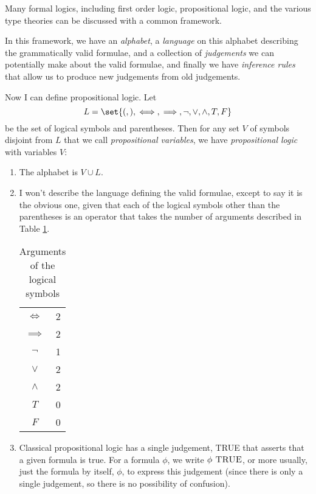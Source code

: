 \documentclass{article}
\theoremstyle{remark}
\newcommand\TRUE{\textsc{ TRUE}}
\begin{document}
Many formal logics, including first order logic,
propositional logic, and the various type theories
can be discussed
with a common framework. 

In this framework, we have an \emph{alphabet},
a \emph{language} on this alphabet describing the grammatically
valid formulae, and a collection of 
\emph{judgements} we can potentially make about the valid formulae,
and finally we have \emph{inference rules} that allow us to 
produce new judgements from old judgements.

\begin{definition}
    Now I can define propositional logic. 
    Let 
    \[ L=\set{(,),\iff,\implies,
    \lnot,\vee,\wedge,
    T,F} \]
    be the set of logical symbols and parentheses.
    Then for any set $V$ 
    of symbols disjoint from $L$ 
    that we call \emph{propositional variables},
    we have \emph{propositional logic} with variables $V$:
    \begin{enumerate}
        \item The alphabet is $V\cup L$.
        \item I won't describe the language defining 
            the valid formulae, except to say it is the obvious one, 
            given that each of the logical symbols other than 
            the parentheses is an operator that
            takes the number of arguments described in 
            Table \ref{tab:log-args}.
            \begin{table}[b]
                \centering
                \begin{tabular}{cc}
                    $\iff$ & 2 \\
                    $\implies$ & 2  \\
                    $\lnot$ & 1 \\
                    $\vee$ & 2\\
                    $\wedge$ & 2\\
                    $T$ & 0\\
                    $F$ & 0\\
                \end{tabular}
                \caption{Arguments of the logical symbols}
                \label{tab:log-args}
            \end{table}
        \item Classical propositional logic has a single judgement,
            \textsc{TRUE}
            that asserts that a given formula is true.
            For a formula $\phi$, we write $\phi\TRUE$, or 
            more usually, just the formula by itself,
            $\phi$, to express this judgement (since there is only
            a single judgement, so there is no possibility of 
            confusion).


\end{enumerate}
\end{definition}
\end{document}
